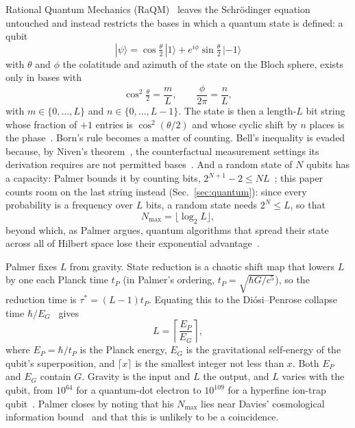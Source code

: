 \documentclass[aps,prd,twocolumn,superscriptaddress,nofootinbib,showkeys]{revtex4-2}
\begin{document}
Rational Quantum Mechanics (RaQM)~\cite{palmer2020,palmer2026,palmer2026b,palmer2026c} leaves the Schr\"odinger equation untouched and instead restricts the bases in which a quantum state is defined: a qubit
\begin{equation}
|\psi\rangle = \cos\tfrac{\theta}{2}\,|1\rangle + e^{i\phi}\sin\tfrac{\theta}{2}\,|{-1}\rangle
\label{eq:qubit}
\end{equation}
with $\theta$ and $\phi$ the colatitude and azimuth of the state on the Bloch sphere, exists only in bases with
\begin{equation}
\cos^2\tfrac{\theta}{2} = \frac{m}{L},\qquad \frac{\phi}{2\pi} = \frac{n}{L},
\label{eq:raqm}
\end{equation}
with $m\in\{0,\dots,L\}$ and $n\in\{0,\dots,L-1\}$. The state is then a length-$L$ bit string whose fraction of $+1$ entries is $\cos^2(\theta/2)$ and whose cyclic shift by $n$ places is the phase~\cite{palmer2026}. Born's rule becomes a matter of counting. Bell's inequality is evaded because, by Niven's theorem~\cite{niven1956}, the counterfactual measurement settings its derivation requires are not permitted bases~\cite{palmer2024,palmer2026b}. And a random state of $N$ qubits has a capacity: Palmer bounds it by counting bits, $2^{N+1} - 2 \le NL$~\cite{palmer2026c}; this paper counts room on the last string instead (Sec.~\ref{sec:quantum}): since every probability is a frequency over $L$ bits, a random state needs $2^N \le L$, so that
\begin{equation}
N_{\max} = \lfloor\log_2 L\rfloor ,
\label{eq:nmax}
\end{equation}
beyond which, as Palmer argues, quantum algorithms that spread their state across all of Hilbert space lose their exponential advantage~\cite{palmer2026}.

Palmer fixes $L$ from gravity. State reduction is a chaotic shift map that lowers $L$ by one each Planck time $t_P$ (in Palmer's ordering, $t_P = \sqrt{\hbar G/c^5}$), so the reduction time is $\tau^* = (L-1)t_P$. Equating this to the Di\'osi--Penrose collapse time $\hbar/E_G$~\cite{diosi1989,penrose1996} gives
\begin{equation}
L = \left\lceil\frac{E_P}{E_G}\right\rceil ,
\label{eq:palmerL}
\end{equation}
where $E_P = \hbar/t_P$ is the Planck energy, $E_G$ is the gravitational self-energy of the qubit's superposition, and $\lceil x\rceil$ is the smallest integer not less than $x$. Both $E_P$ and $E_G$ contain $G$. Gravity is the input and $L$ the output, and $L$ varies with the qubit, from $10^{64}$ for a quantum-dot electron to $10^{109}$ for a hyperfine ion-trap qubit~\cite{palmer2026}. Palmer closes by noting that his $N_{\max}$ lies near Davies' cosmological information bound~\cite{davies2007} and that this is unlikely to be a coincidence.
\end{document}
